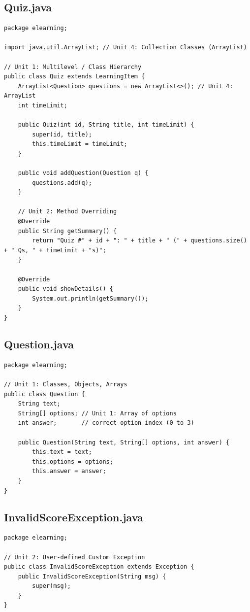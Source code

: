 \documentclass[12pt,a4paper]{article}
\begin{document}
\subsection{Quiz.java}
\begin{lstlisting}
package elearning;

import java.util.ArrayList; // Unit 4: Collection Classes (ArrayList)

// Unit 1: Multilevel / Class Hierarchy
public class Quiz extends LearningItem {
    ArrayList<Question> questions = new ArrayList<>(); // Unit 4: ArrayList
    int timeLimit;

    public Quiz(int id, String title, int timeLimit) {
        super(id, title);
        this.timeLimit = timeLimit;
    }

    public void addQuestion(Question q) {
        questions.add(q);
    }

    // Unit 2: Method Overriding
    @Override
    public String getSummary() {
        return "Quiz #" + id + ": " + title + " (" + questions.size() + " Qs, " + timeLimit + "s)";
    }

    @Override
    public void showDetails() {
        System.out.println(getSummary());
    }
}
\end{lstlisting}

\subsection{Question.java}
\begin{lstlisting}
package elearning;

// Unit 1: Classes, Objects, Arrays
public class Question {
    String text;
    String[] options; // Unit 1: Array of options
    int answer;       // correct option index (0 to 3)

    public Question(String text, String[] options, int answer) {
        this.text = text;
        this.options = options;
        this.answer = answer;
    }
}
\end{lstlisting}

\subsection{InvalidScoreException.java}
\begin{lstlisting}
package elearning;

// Unit 2: User-defined Custom Exception
public class InvalidScoreException extends Exception {
    public InvalidScoreException(String msg) {
        super(msg);
    }
}
\end{lstlisting}
\end{document}
